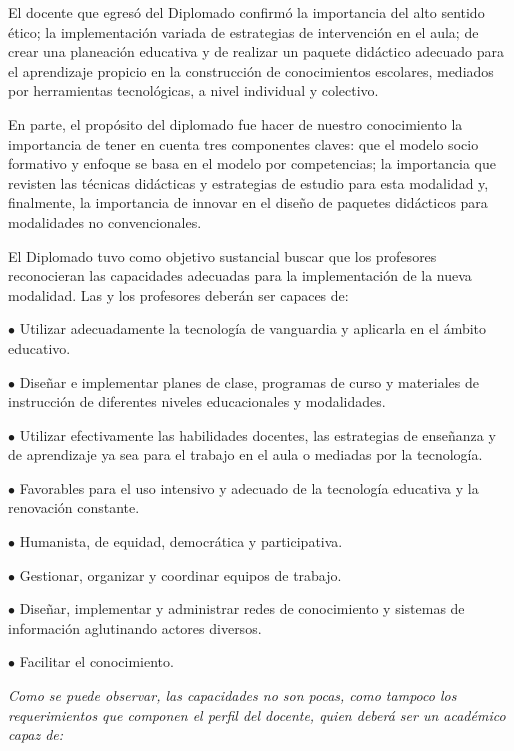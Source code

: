 El docente que egresó del Diplomado confirmó la importancia del alto 
sentido ético; la implementación variada de estrategias de intervención 
en el aula; de crear una planeación educativa y de realizar un paquete 
didáctico adecuado para el aprendizaje propicio en la construcción de 
conocimientos escolares, mediados por herramientas tecnológicas, a 
nivel individual y colectivo.

En parte, el propósito del diplomado fue hacer de nuestro conocimiento 
la importancia de tener en cuenta tres componentes claves: que el 
modelo socio formativo y enfoque se basa en el modelo por competencias; 
la importancia que revisten las técnicas didácticas y estrategias de 
estudio para esta modalidad y, finalmente, la importancia de innovar en 
el diseño de paquetes didácticos para modalidades no convencionales.
\enlargethispage{1\baselineskip}

El Diplomado tuvo como objetivo sustancial buscar que los profesores 
reconocieran las capacidades adecuadas para la implementación de la 
nueva modalidad. Las y los profesores deberán ser capaces de:
\begin{Obs}
\item[$\bullet$] Utilizar adecuadamente la tecnología de vanguardia y aplicarla en el
ámbito educativo.
\item[$\bullet$] Diseñar e implementar planes de clase, programas de curso y materiales de
instrucción de diferentes niveles educacionales y  modalidades.
\item[$\bullet$] Utilizar efectivamente las habilidades docentes, las estrategias de
enseñanza y de aprendizaje ya sea para el trabajo en el aula o mediadas por la
tecnología.
\enlargethispage{1\baselineskip}
\item[$\bullet$] Favorables para el uso intensivo y adecuado de la tecnología educativa y
la renovación constante.
\item[$\bullet$] Humanista, de equidad, democrática y participativa. 
\item[$\bullet$] Gestionar, organizar y coordinar equipos de trabajo.
\item[$\bullet$] Diseñar, implementar y administrar redes de conocimiento y sistemas de
información aglutinando actores diversos.
\item[$\bullet$] Facilitar el conocimiento.  
\end{Obs}

\textsl{Como se puede observar, las
capacidades no son pocas, como tampoco los requerimientos que componen el
perfil del docente, quien deberá ser un académico capaz de:}

